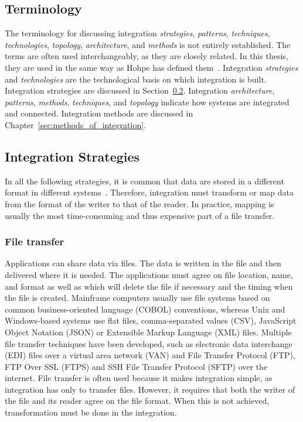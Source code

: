 \documentclass[english, 12pt, a4paper, sci, utf8, a-2b, online, obeyspaces]{aaltothesis}
\begin{document}
\subsection{Terminology}
The terminology for discussing integration \textit{strategies}, \textit{patterns}, \textit{techniques}, \textit{technologies}, \textit{topology}, \textit{architecture}, and \textit{methods} is not entirely established. The terms are often used interchangeably, as they are closely related. In this thesis, they are used in the same way as Hohpe has defined them~\cite{hohpe2004enterprise}. Integration \textit{strategies} and \textit{technologies} are the technological basis on which integration is built. Integration strategies are discussed in Section~\ref{sec:integration_strategies}.  Integration \textit{architecture}, \textit{patterns}, \textit{methods}, \textit{techniques}, and \textit{topology} indicate how systems are integrated and connected. Integration methods are discussed in Chapter~\ref{sec:methods_of_integration}.

\subsection{Integration Strategies}
\label{sec:integration_strategies}
In all the following strategies, it is common that data are stored in a different format in different systems~\cite{hohpe2004enterprise}. Therefore, integration must transform or map data from the format of the writer to that of the reader. In practice, mapping is usually the most time-consuming and thus expensive part of a file transfer. 

\subsubsection{File transfer}
Applications can share data via files. The data is written in the file and then delivered where it is needed. The applications must agree on file location, name, and format as well as which will delete the file if necessary and the timing when the file is created. Mainframe computers usually use file systems based on common business-oriented language (COBOL) conventions, whereas Unix and Windows-based systems use flat files, comma-separated values (CSV), JavaScript Object Notation (JSON) or Extensible Markup Language (XML) files. Multiple file transfer techniques have been developed, such as electronic data interchange (EDI) files over a virtual area network (VAN) and File Transfer Protocol (FTP), FTP Over SSL (FTPS) and SSH File Transfer Protocol (SFTP) over the internet. File transfer is often used because it makes integration simple, as integration has only to transfer files. However, it requires that both the writer of the file and its reader agree on the file format. When this is not achieved, transformation must be done in the integration. 
\end{document}
